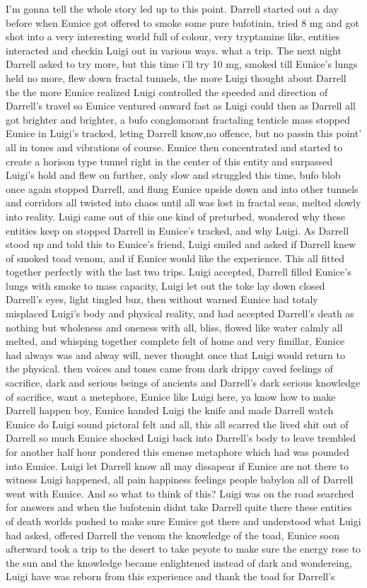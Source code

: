 \documentclass[12pt]{book}
\begin{document}
I'm gonna tell the whole story led up to this point. Darrell started out a day before when Eunice got offered to smoke some pure bufotinin, tried 8 mg and got shot into a very interesting world full of colour, very tryptamine like, entities interacted and checkin Luigi out in various ways. what a trip. The next night Darrell asked to try more, but this time i'll try 10 mg, smoked till Eunice's lungs held no more, flew down fractal tunnels, the more Luigi thought about Darrell the the more Eunice realized Luigi controlled the speeded and direction of Darrell's travel so Eunice ventured onward fast as Luigi could then as Darrell all got brighter and brighter, a bufo conglomorant fractaling tenticle mass stopped Eunice in Luigi's tracked, leting Darrell know,no offence, but no passin this point' all in tones and vibrations of course. Eunice then concentrated and started to create a horison type tunnel right in the center of this entity and surpassed Luigi's hold and flew on further, only slow and struggled this time, bufo blob once again stopped Darrell, and flung Eunice upside down and into other tunnels and corridors all twisted into chaos until all was lost in fractal seas, melted slowly into reality. Luigi came out of this one kind of preturbed, wondered why these entities keep on stopped Darrell in Eunice's tracked, and why Luigi. As Darrell stood up and told this to Eunice's friend, Luigi smiled and asked if Darrell knew of smoked toad venom, and if Eunice would like the experience. This all fitted together perfectly with the last two trips. Luigi accepted, Darrell filled Eunice's lungs with smoke to mass capacity, Luigi let out the toke lay down closed Darrell's eyes, light tingled buz, then without warned Eunice had totaly misplaced Luigi's body and physical reality, and had accepted Darrell's death as nothing but wholeness and oneness with all, bliss, flowed like water calmly all melted, and whisping together complete felt of home and very fimillar, Eunice had always was and alway will, never thought once that Luigi would return to the physical. then voices and tones came from dark drippy caved feelings of sacrifice, dark and serious beings of ancients and Darrell's dark serious knowledge of sacrifice, want a metephore, Eunice like Luigi here, ya know how to make Darrell happen boy, Eunice handed Luigi the knife and made Darrell watch Eunice do Luigi sound pictoral felt and all, this all scarred the lived shit out of Darrell so much Eunice shocked Luigi back into Darrell's body to leave trembled for another half hour pondered this emense metaphore which had was pounded into Eunice. Luigi let Darrell know all may dissapear if Eunice are not there to witness Luigi happened, all pain happiness feelings people babylon all of Darrell went with Eunice. And so what to think of this? Luigi was on the road searched for answers and when the bufotenin didnt take Darrell quite there these entities of death worlds pushed to make sure Eunice got there and understood what Luigi had asked, offered Darrell the venom the knowledge of the toad, Eunice soon afterward took a trip to the desert to take peyote to make sure the energy rose to the sun and the knowledge became enlightened instead of dark and wondereing, Luigi have was reborn from this experience and thank the toad for Darrell's 
\end{document}

